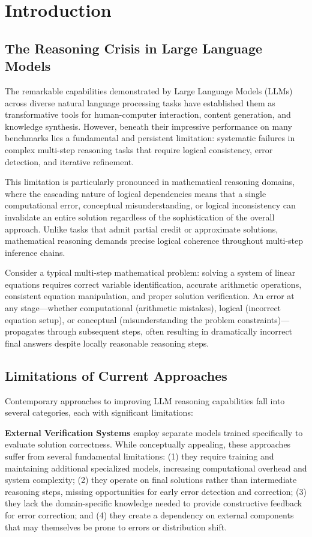 \documentclass[10pt,twocolumn]{article}
\begin{document}
\section{Introduction}

\subsection{The Reasoning Crisis in Large Language Models}

The remarkable capabilities demonstrated by Large Language Models (LLMs) across diverse natural language processing tasks have established them as transformative tools for human-computer interaction, content generation, and knowledge synthesis. However, beneath their impressive performance on many benchmarks lies a fundamental and persistent limitation: systematic failures in complex multi-step reasoning tasks that require logical consistency, error detection, and iterative refinement.

This limitation is particularly pronounced in mathematical reasoning domains, where the cascading nature of logical dependencies means that a single computational error, conceptual misunderstanding, or logical inconsistency can invalidate an entire solution regardless of the sophistication of the overall approach. Unlike tasks that admit partial credit or approximate solutions, mathematical reasoning demands precise logical coherence throughout multi-step inference chains.

Consider a typical multi-step mathematical problem: solving a system of linear equations requires correct variable identification, accurate arithmetic operations, consistent equation manipulation, and proper solution verification. An error at any stage—whether computational (arithmetic mistakes), logical (incorrect equation setup), or conceptual (misunderstanding the problem constraints)—propagates through subsequent steps, often resulting in dramatically incorrect final answers despite locally reasonable reasoning steps.

\subsection{Limitations of Current Approaches}

Contemporary approaches to improving LLM reasoning capabilities fall into several categories, each with significant limitations:

\textbf{External Verification Systems} employ separate models trained specifically to evaluate solution correctness. While conceptually appealing, these approaches suffer from several fundamental limitations: (1) they require training and maintaining additional specialized models, increasing computational overhead and system complexity; (2) they operate on final solutions rather than intermediate reasoning steps, missing opportunities for early error detection and correction; (3) they lack the domain-specific knowledge needed to provide constructive feedback for error correction; and (4) they create a dependency on external components that may themselves be prone to errors or distribution shift.
\end{document}
